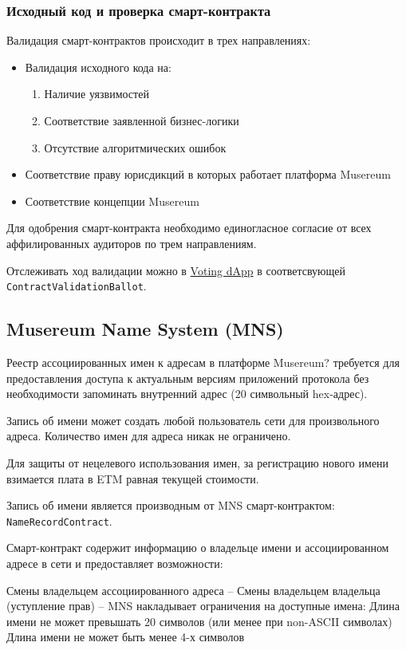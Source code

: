 \documentclass[12pt]{report}
\def\code#1{\colorbox{light-gray}{\texttt{#1}}}
\begin{document}
\subsubsection{Исходный код и проверка смарт-контракта}
\label{tech-apps-contracts-validate}
\begin{multicols}{2}
Валидация смарт-контрактов происходит в трех направлениях:
\begin{itemize}
	\item Валидация исходного кода на:
		\begin{enumerate}
			\item Наличие уязвимостей
			\item Соответствие заявленной бизнес-логики
			\item Отсутствие алгоритмических ошибок
		\end{enumerate}
	\item Соответствие праву юрисдикций в которых работает платформа Musereum
	\item Соответствие концепции Musereum
\end{itemize}
\vfill\null
\columnbreak
Для одобрения смарт-контракта необходимо единогласное согласие от всех аффилированных аудиторов по трем направлениям. 

Отслеживать ход валидации можно в \hyperref[tech-apps-voting]{Voting dApp} в соответсвующей \code{ContractValidationBallot}.
\end{multicols}
\subsection{Musereum Name System (MNS)}
\label{tech-apps-mns}
\begin{multicols}{2}
Реестр ассоциированных имен к адресам в платформе Musereum? требуется для предоставления доступа к актуальным версиям приложений протокола без необходимости запоминать внутренний адрес (20 символьный hex-адрес).

Запись об имени может создать любой пользователь сети для произвольного адреса. Количество имен для адреса никак не ограничено. 

Для защиты от нецелевого использования имен, за регистрацию нового имени взимается плата в ETM равная текущей стоимости.

Запись об имени является производным от MNS смарт-контрактом: \code{NameRecordContract}.

Смарт-контракт содержит информацию о владельце имени и ассоциированном адресе в сети и предоставляет возможности:

Смены владельцем ассоциированного адреса – 
Смены владельцем владельца (уступление прав) – 
MNS накладывает ограничения на доступные имена:
Длина имени не может превышать 20 символов (или менее при non-ASCII символах)
Длина имени не может быть менее 4-х символов
\end{multicols}
\end{document}
